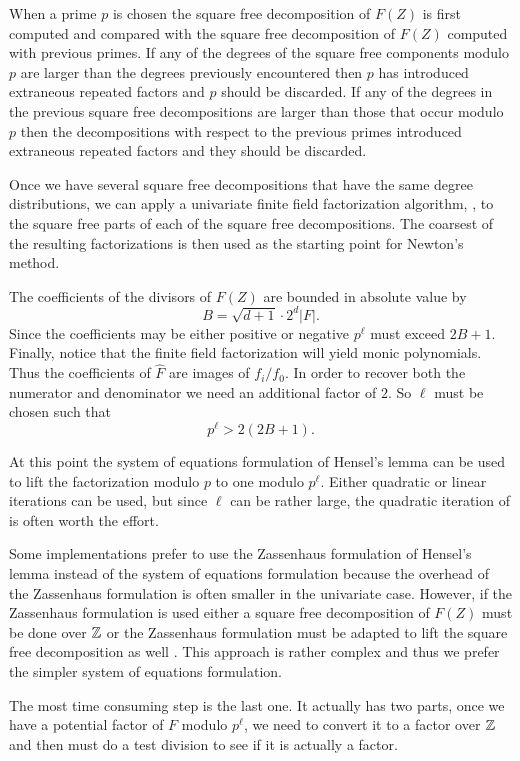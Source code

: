 When a prime $p$ is chosen the square free decomposition of $F(Z)$ is
first computed and compared with the square free decomposition of
$F(Z)$ computed with previous primes.  If any of the degrees of the
square free components modulo $p$ are larger than the degrees
previously encountered then $p$ has introduced extraneous repeated
factors and $p$ should be discarded.  If any of the degrees in the
previous square free decompositions are larger than those that occur
modulo $p$ then the decompositions with respect to the previous primes
introduced extraneous repeated factors and they should be discarded.  

Once we have several square free decompositions that have the same
degree distributions, we can apply a univariate finite field
factorization algorithm, \eg,  to the square free parts
of each of the square free decompositions.  The coarsest of the
resulting factorizations is then used as the starting point for
Newton's method. 

The coefficients of the divisors of $F(Z)$ are bounded in absolute
value by
\[
B = \sqrt{d+1} \cdot 2^d |F|.
\]
Since the coefficients may be either positive or negative $p^{\ell}$
must exceed $2B+1$.  Finally, notice that the finite field
factorization will yield monic polynomials.  Thus the coefficients of
$\hat{F}$ are images of $f_i/f_0$.  In order to recover both the
numerator and denominator we need an additional factor of $2$.  So
$\ell$ must be chosen such that
\[
p^{\ell} > 2(2B+1).
\]

At this point the system of equations formulation of Hensel's lemma
can be used to lift the factorization modulo $p$ to one modulo
$p^{\ell}$.  Either quadratic or linear iterations can be used, but
since $\ell$ can be rather large, the quadratic iteration of
 is often worth the effort.

Some implementations prefer to use the Zassenhaus formulation of
Hensel's lemma instead of the system of equations formulation because
the overhead of the Zassenhaus formulation is often smaller in the
univariate case.  However, if the Zassenhaus formulation is used
either a square free decomposition of $F(Z)$ must be done over $\mathbb{Z}$ or
the Zassenhaus formulation must be adapted to lift the square free
decomposition as well \cite{Wang1979-ga}.  This approach is rather
complex and thus we prefer the simpler system of equations
formulation.

\medskip
The most time consuming step is the last one.  It actually has two
parts, once we have a potential factor of $F$ modulo $p^{\ell}$, we
need to convert it to a factor over $\mathbb{Z}$ and then must do a test division 
to see if it is actually a factor.

